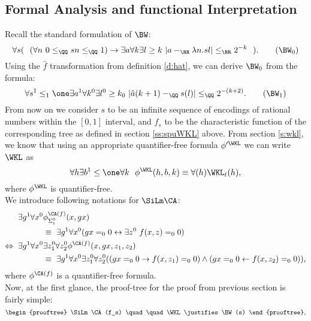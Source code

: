 %
\subsection{Formal Analysis and functional Interpretation} \label{ss:fafi}
%
%
%
%
Recall the standard formulation of $\BW$:\\
\[
\forall s(\ \ (\forall n\ 0\leq_\QQ sn\leq_\QQ 1) \rightarrow 
  \exists a\forall k\exists l\geq k\ |a-_\RR\lambda n.sl|\leq_\RR2^{-k}\ \ )
\text{.}
\tag{$\BW_0$}
\]
Using the $\hat f$ transformation from definition \ref{d:hat}, we can
derive $\BW_0$ from the formula:
\[
\forall s^1\leq_1\one\exists a^1\forall k^0\exists l^0\geq k_0\ 
 |\hat a(k+1)-_\QQ s(l)|\leq_\QQ2^{-(k+2)}
\text{.}
\tag{$\BW_1$}
\]
From now on we consider $s$ to be an infinite sequence of encodings of rational 
numbers within the $[0,1]$ interval, and $f_s$ to be the characteristic function of
the corresponding tree as defined in section \ref{ss:spuWKL} above.
From section \ref{s:wkl}, we know that using an 
appropriate quantifier-free formula $\phi'^{\WKL}$
we can write $\WKL$ as
\[
\forall h\exists b^1\leq\one\forall k\ \ \phi^{\WKL}(h,b,k)\equiv\forall(h)\WKL_t(h)
\text{,}
\]
where $\phi^{\WKL}$ is quantifier-free.\\
We introduce following notations for $\SiLm\CA$:
\begin{align*}
\exists g^1\forall x^0 &\phi^{\CA(f)}_{\Sigma^0_1}(x,gx)\\
&\equiv\ \exists g^1\forall x^0 (gx=_00 \leftrightarrow \exists z^0\ f(x,z)=_00)\\
\Leftrightarrow\ 
\exists g^1\forall x^0 &\exists z^0_1\forall z^0_2 \phi^{\CA(f)}(x,gx,z_1,z_2)\\
&\equiv\
\exists g^1\forall x^0\exists z^0_1\forall z^0_2
   ((gx=_00 \rightarrow f(x,z_1)=_00)\wedge(gx=_00 \leftarrow f(x,z_2)=_00) )
\text{,}
\end{align*}
where $\phi^{\CA(f)}$ is a quantifier-free formula. \\
Now, at the first glance, the proof-tree for the proof from previous
 section is fairly simple:
\[
\begin{prooftree}
\SiLm\CA(f_s)
 \quad \quad
\WKL
\justifies
\BW(s)
\end{prooftree}
\text{,}
\]
